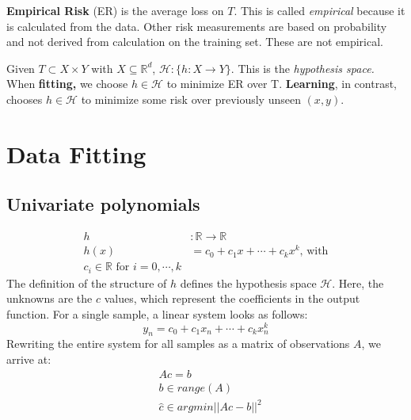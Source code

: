 \documentclass[titlepage, 12pt, leqno]{article}
\begin{document}
\begin{definition}
    \textbf{Empirical Risk} (ER) is the average loss on $T$. This is called
    \textit{empirical} because it is calculated from the data. Other risk 
    measurements are based on probability and not derived from calculation on the
    training set. These are not empirical.
\end{definition}

Given $T \subset X \times Y$ with $X \subseteq \mathbb{R}^{d}$, 
$ \mathcal{H}: \{h:X \rightarrow Y\}$. This is the \textit{hypothesis space.}
When \textbf{fitting,} we choose $h \in \mathcal{H}$ to minimize ER over T. 
\textbf{Learning}, in contrast, chooses $h \in \mathcal{H}$ to minimize some risk
over previously unseen $(x,y)$.

\pagebreak
\section{Data Fitting}
\subsection{Univariate polynomials}
\begin{align*}
    h &: \mathbb{R} \rightarrow \mathbb{R} \\
    h(x) &= c_0 + c_1x + \cdots + c_kx^{k} \text{, with} \\
    c_i \in \mathbb{R} \text{ for } i = 0, \cdots ,k
\end{align*}
The definition of the structure of $h$ defines the hypothesis space $\mathcal{H}$.
Here, the unknowns are the $c$ values, which represent the coefficients in the
output function. For a single sample, a linear system looks as follows:
\[
y_n = c_0 + c_1x_n + \cdots + c_kx^{k}_n
\]
Rewriting the entire system for all samples as a matrix of observations $A$, 
we arrive at:
\begin{align*}
    &Ac = b \\
    &b \in range(A) \\
    &\hat c \in argmin ||Ac-b||^{2}
\end{align*}
\end{document}
